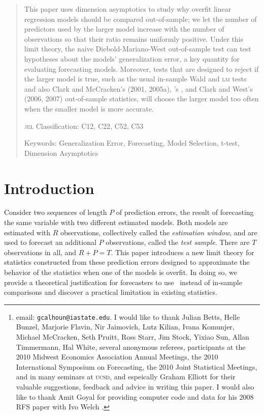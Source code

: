 \documentclass[11pt]{article}
\author{Gray Calhoun\thanks{email: \texttt{gcalhoun@iastate.edu}. I
    would like to thank Julian Betts, Helle Bunzel, Marjorie Flavin,
    Nir Jaimovich, Lutz Kilian, Ivana Komunjer, Michael McCracken,
    Seth Pruitt, Ross Starr, Jim Stock, Yixiao Sun, Allan Timmermann,
    Hal White, several anonymous referees, participants at the 2010
    Midwest Economics Association Annual Meetings, the 2010
    International Symposium on Forecasting, the 2010 Joint Statistical
    Meetings, and in many seminars at \textsc{ucsd}, and espeically
    Graham Elliott for their valuable suggestions, feedback and advice
    in writing this paper.  I would also like to thank Amit Goyal for
    providing computer code and data for his 2008 RFS paper with Ivo
    Welch \citep{GoW:08}.} \\ Iowa State University}
\date{October 24, 2011}
\newcommand{\citepos}[1]{\citeauthor{#1}'s \citeyearpar{#1}}
\begin{document}
\maketitle

\begin{abstract}\thispagestyle{empty}\noindent
  This paper uses dimension asymptotics to study why overfit linear
  regression models should be compared out-of-sample; we let the
  number of predictors used by the larger model increase with the
  number of observations so that their ratio remains uniformly
  positive.  Under this limit theory, the naive Diebold-Mariano-West
  out-of-sample test can test hypotheses about the models'
  generalization error, a key quantity for evaluating forecasting
  models.  Moreover, tests that are designed to reject if the larger
  model is true, such as the usual in-sample Wald and \textsc{lm}
  tests and also Clark and McCracken's (2001, 2005a),
  \citepos{Mcc:07}, and Clark and West's (2006, 2007) out-of-sample
  statistics, will choose the larger model too often when the smaller
  model is more accurate.

\noindent \textsc{jel} Classification: C12, C22, C52, C53

\noindent Keywords: Generalization Error, Forecasting, Model
Selection, t-test, Dimension Asymptotics
\end{abstract}
\newpage

\section{Introduction}\label{sec:introduction}
Consider two sequences of length $P$ of prediction errors, the result
of forecasting the same variable with two different estimated models.
Both models are estimated with $R$ observations, collectively called
the {\em estimation window}, and are used to forecast an additional
$P$ observations, called the {\em test sample}.  There are $T$
observations in all, and $R+P=T$.  This paper introduces a new limit
theory for statistics constructed from these prediction errors
designed to approximate the behavior of the statistics when one of the
models is overfit.  In doing so, we provide a theoretical
justification for forecasters to use \oos\ instead of in-sample
comparisons and discover a practical limitation in existing statistics.
\end{document}
